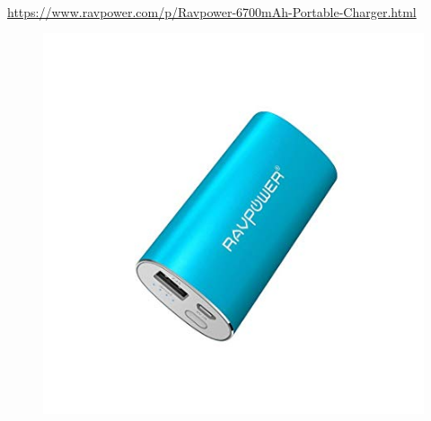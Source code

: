 \documentclass[12pt]{report}
\begin{document}
	\paragraph{}
	\url{https://www.ravpower.com/p/Ravpower-6700mAh-Portable-Charger.html}
	\begin{figure}[H]
		\begin{center}
			\includegraphics[scale=0.6]{res/power.jpg}
		\end{center}
	\end{figure}
\end{document}
